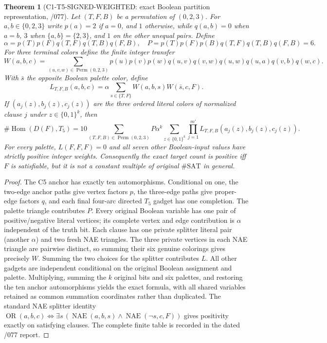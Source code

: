 \documentclass[11pt]{article}
\newtheorem{theorem}{Theorem}
\begin{document}
\begin{theorem}[C1-T5-SIGNED-WEIGHTED: exact Boolean partition representation, /077]
Let $(T,F,B)$ be a permutation of $(0,2,3)$.
For $a,b\in\{0,2,3\}$ write
$p(a)=2$ if $a=0$, and $1$ otherwise, while
$q(a,b)=0$ when $a=b$, $3$ when $\{a,b\}=\{2,3\}$,
and $1$ on the other unequal pairs.
Define
\[
 \alpha=p(T)p(F)q(T,F)q(T,B)q(F,B),
 \quad P=p(T)p(F)p(B)q(T,F)q(T,B)q(F,B)=6.
\]
For three terminal colors define the finite integer transfer
\[
 W(a,b,c)=
 \sum_{(u,v,w)\in\operatorname{Perm}(0,2,3)}
 p(u)p(v)p(w)q(u,v)q(v,w)q(u,w)
 q(u,a)q(v,b)q(w,c).
\]
With $\bar s$ the opposite Boolean palette color, define
\[
 L_{T,F,B}(a,b,c)=
 \alpha\sum_{s\in\{T,F\}}W(a,b,s)W(\bar s,c,F).
\]
If $(a_j(z),b_j(z),c_j(z))$ are the three ordered literal
colors of normalized clause $j$ under $z\in\{0,1\}^k$, then
\[
 \boxed{\#\operatorname{Hom}(D(F),T_5)
 =10\sum_{(T,F,B)\in\operatorname{Perm}(0,2,3)}
 P\alpha^k\sum_{z\in\{0,1\}^k}
 \prod_{j=1}^{m'}L_{T,F,B}(a_j(z),b_j(z),c_j(z)).}
\]
For every palette, $L(F,F,F)=0$ and all seven other
Boolean-input values have strictly positive integer weights.
Consequently the exact target count is positive iff $F$ is
satisfiable, but it is \emph{not} a constant multiple of original
$\#\mathrm{SAT}$ in general.
\end{theorem}
\begin{proof}
The C5 anchor has exactly ten automorphisms. Conditional on one,
the two-edge anchor paths give vertex factors $p$, the
three-edge paths give proper-edge factors $q$, and each final
four-arc directed $T_5$ gadget has one completion. The palette
triangle contributes $P$. Every original Boolean variable
has one pair of positive/negative literal vertices; its
complete vertex and edge contribution is $\alpha$ independent
of the truth bit. Each clause has one private splitter literal
pair (another $\alpha$) and two fresh NAE triangles. The three
private vertices in each NAE triangle are pairwise distinct,
so summing their six genuine colorings gives precisely $W$.
Summing the two choices for the splitter contributes $L$.
All other gadgets are independent conditional on the original
Boolean assignment and palette. Multiplying, summing the $k$
original bits and six palettes, and restoring the ten anchor
automorphisms yields the exact formula, with all shared variables
retained as common summation coordinates rather than duplicated.
The standard NAE splitter identity
$\operatorname{OR}(a,b,c)\Leftrightarrow
\exists s\,(\operatorname{NAE}(a,b,s)\wedge
\operatorname{NAE}(\neg s,c,F))$
gives positivity exactly on satisfying clauses.
The complete finite table is recorded in the dated /077 report.
\end{proof}
\end{document}
